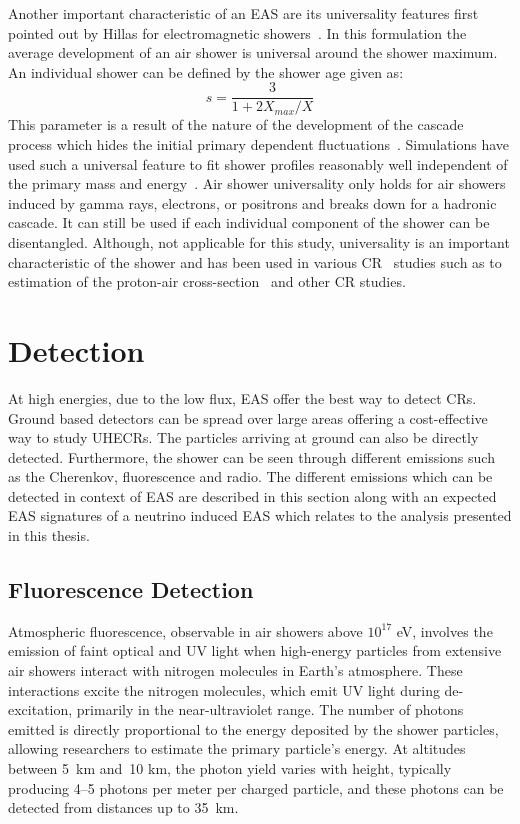 Another important characteristic of an EAS are its universality features first pointed out by Hillas for electromagnetic showers~\cite{A_M_Hillas_1982}. In this formulation the average development of an air shower is universal around the shower maximum. An individual shower can be defined by the shower age given as:
\begin{equation}
    s = \frac{3}{1+2 X_{max}/X}
\end{equation}
This parameter is a result of the nature of the development of the cascade process which hides the initial primary dependent fluctuations~\cite{Fedosimova:2017vxz}. Simulations have used such a universal feature to fit shower profiles reasonably well independent of the primary mass and energy~\cite{Bridgeman:2017MD}. Air shower universality only holds for air showers induced by gamma rays, electrons, or positrons and breaks down for a hadronic cascade. It can still be used if each individual component of the shower can be disentangled. Although, not applicable for this study, universality is an important characteristic of the shower and has been used in various CR~\cite{cazon2024protonairinteractionsultrahighenergies} studies such as to estimation of the proton-air cross-section~\cite{Ulrich_2009} and other CR studies.

\section{Detection}
\label{sec:EAS_det}
At high energies, due to the low flux, EAS offer the best way to detect CRs. Ground based detectors can be spread over large areas offering a cost-effective way to study UHECRs. The particles arriving at ground can also be directly detected. Furthermore, the shower can be seen through different emissions such as the Cherenkov, fluorescence and radio.  The different emissions which can be detected in context of EAS are described in this section along with an expected EAS signatures of a neutrino induced EAS which relates to the analysis presented in this thesis.

\subsection{Fluorescence Detection}
\label{sec:EAS_flu}
Atmospheric fluorescence, observable in air showers above \(10^{17}\) eV, involves the emission of faint optical and \gls{UV} light when high-energy particles from extensive air showers interact with nitrogen molecules in Earth's atmosphere. These interactions excite the nitrogen molecules, which emit UV light during de-excitation, primarily in the near-ultraviolet range. The number of photons emitted is directly proportional to the energy deposited by the shower particles, allowing researchers to estimate the primary particle's energy. At altitudes between 5 km and 10 km, the photon yield varies with height, typically producing 4–5 photons per meter per charged particle, and these photons can be detected from distances up to 35 km.

